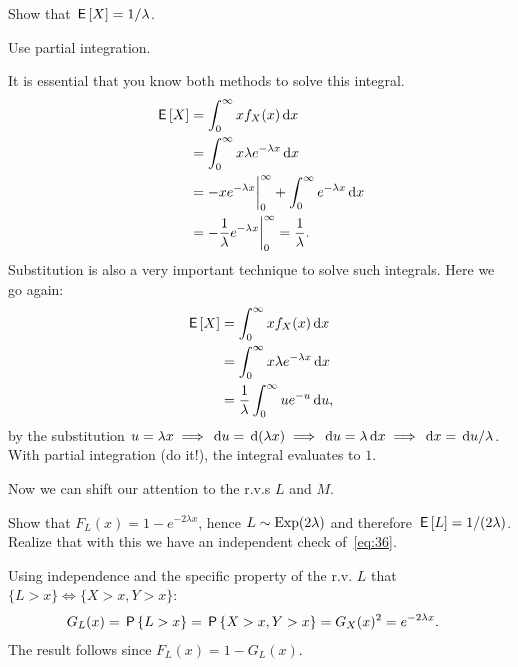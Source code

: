 \documentclass[a4paper,11pt]{article}
\begin{document}
\begin{exercise}\label{ex:4}
Show that $\,\mathsf{E}\left[X\right] = 1/\lambda$.
\begin{hint}
  Use partial integration.
\end{hint}
\begin{solution}
It is essential that  you know both methods to solve this integral.
  \begin{align}
\,\mathsf{E}\left[X\right]
&= \int_{0}^{\infty}  x f_{X}(x) \,\textrm{d}x  \\
&= \int_{0}^{\infty}  x \lambda e^{-\lambda x} \,\textrm{d}x  \\
&= - xe^{-\lambda x} \biggr|_{0}^{\infty} + \int_{0}^{\infty}  e^{-\lambda x} \,\textrm{d}x  \\
&=  - \frac 1 \lambda e^{-\lambda x} \biggr|_{0}^{\infty} = \frac 1 \lambda.
  \end{align}
Substitution is also a very important technique to solve such integrals. Here we go again:
  \begin{align}
\,\mathsf{E}\left[X\right]
&= \int_{0}^{\infty}  x f_{X}(x) \,\textrm{d}x  \\
&= \int_{0}^{\infty}  x \lambda e^{-\lambda x} \,\textrm{d}x  \\
&= \frac 1 \lambda \int_{0}^{\infty}  u  e^{- u} \,\textrm{d}u,
  \end{align}
  by the substitution $u=\lambda x \implies \,\textrm{d}u = \,\textrm{d}(\lambda x) \implies \,\textrm{d}u = \lambda \,\textrm{d}x \implies \,\textrm{d}x = \,\textrm{d}u / \lambda$.
  With partial integration (do it!), the integral evaluates to $1$.
\end{solution}
\end{exercise}


Now we can shift our attention to the r.v.s $L$ and $M$.


\begin{exercise}
  Show that $F_L(x) = 1-e^{-2\lambda x}$, hence  $L\sim \mathrm{Exp}(2\lambda)$ and therefore $\,\mathsf{E}\left[L\right] = 1/(2\lambda)$.
  Realize that with this we have an independent check of~\cref{eq:36}.
\begin{solution}
Using independence and the specific property of the r.v. $L$ that $\{L>x\} \iff \{X>x, Y>x\}$:
 \begin{align}
    \label{eq:22}
G_L(x) = \P{L>x}  &= \P{X>x, Y> x} = G_X(x)^{2} = e^{-2\lambda x}.
  \end{align}
The result follows since  $F_{L}(x) = 1-G_{L}(x)$.
\end{solution}
\end{exercise}
\end{document}
